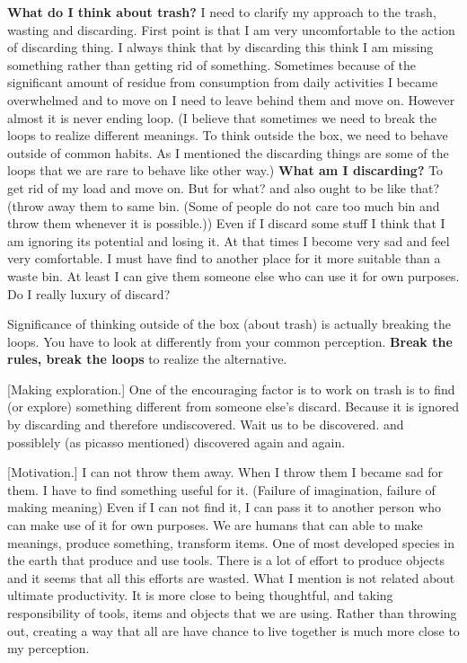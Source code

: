 %
%
\textbf{What do I think about trash?} I need to clarify my approach to the trash, wasting and discarding. First point is that I am very uncomfortable to the action of discarding thing. I always think that by discarding this think I am missing something rather than getting rid of something. Sometimes because of the significant amount of residue from consumption from daily activities I became overwhelmed and to move on I need to leave behind them and move on. However almost it is never ending loop. (I believe that sometimes we need to break the loops to realize different meanings. To think outside the box, we need to behave outside of common habits. As I mentioned the discarding things are some of the loops that we are rare to behave like other way.) \textbf{What am I discarding?} To get rid of my load and move on. But for what? and also ought to be like that? (throw away them to same bin. (Some of people do not care too much bin and throw them whenever it is possible.)) Even if I discard some stuff I think that I am ignoring its potential and losing it. At that times I become very sad and feel very comfortable. I must have find to another place for it more suitable than a waste bin. At least I can give them someone else who can use it for own purposes. Do I really luxury of discard?

Significance of thinking outside of the box (about trash) is actually breaking the loops. You have to look at differently from your common perception. \textbf{Break the rules, break the loops} to realize the alternative. 

[Making exploration.] One of the encouraging factor is to work on trash is to find (or explore) something different from someone else's discard. Because it is ignored by discarding and therefore undiscovered. Wait us to be discovered. and possiblely (as picasso mentioned) discovered again and again. 

[Motivation.] I can not throw them away. When I throw them I became sad for them. I have to find something useful for it. (Failure of imagination, failure of making meaning) Even if I can not find it, I can pass it to another person who can make use of it for own purposes. We are humans that can able to make meanings, produce something, transform items. One of most developed species in the earth that produce and use tools. There is a lot of effort to produce objects and it seems that all this efforts are wasted. What I mention is not related about ultimate productivity. It is more close to being thoughtful, and taking responsibility of tools, items and objects that we are using. Rather than throwing out, creating a way that all are have chance to live together is much more close to my perception.


